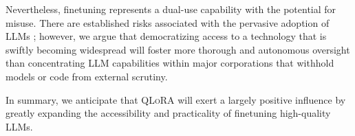 Nevertheless, finetuning represents a dual-use capability with the potential for misuse. There are established risks associated with the pervasive adoption of LLMs \citep{bommasani2021opportunities,bender2021dangers}; however, we argue that democratizing access to a technology that is swiftly becoming widespread will foster more thorough and autonomous oversight than concentrating LLM capabilities within major corporations that withhold models or code from external scrutiny.

In summary, we anticipate that \textsc{QLoRA} will exert a largely positive influence by greatly expanding the accessibility and practicality of finetuning high-quality LLMs.